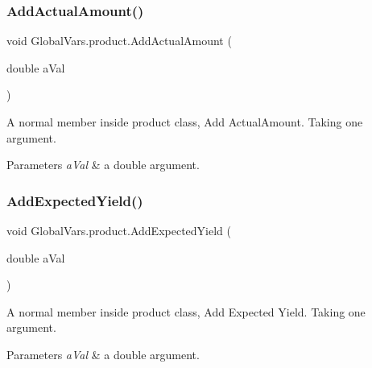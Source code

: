 \subsubsection{\texorpdfstring{AddActualAmount()}{AddActualAmount()}}
{\footnotesize\ttfamily void Global\+Vars.\+product.\+Add\+Actual\+Amount (\begin{DoxyParamCaption}\item[{double}]{a\+Val }\end{DoxyParamCaption})\hspace{0.3cm}{\ttfamily [inline]}}



A normal member inside product class, Add Actual\+Amount. Taking one argument. 


\begin{DoxyParams}{Parameters}
{\em a\+Val} & a double argument. \\
\hline
\end{DoxyParams}
\mbox{\label{class_global_vars_1_1product_a8e8487be42a12272849cfcdfd0e87470}} 
\subsubsection{\texorpdfstring{AddExpectedYield()}{AddExpectedYield()}}
{\footnotesize\ttfamily void Global\+Vars.\+product.\+Add\+Expected\+Yield (\begin{DoxyParamCaption}\item[{double}]{a\+Val }\end{DoxyParamCaption})\hspace{0.3cm}{\ttfamily [inline]}}



A normal member inside product class, Add Expected Yield. Taking one argument. 


\begin{DoxyParams}{Parameters}
{\em a\+Val} & a double argument. \\
\hline
\end{DoxyParams}
\mbox{\label{class_global_vars_1_1product_a6ee6e77e2269f3287020cb39a5781f6e}} 
